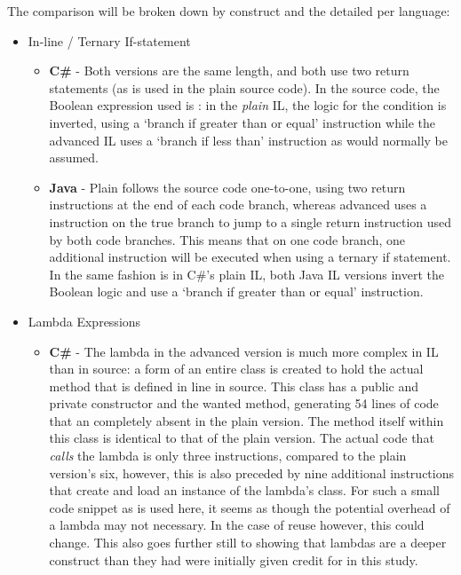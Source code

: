 \documentclass{article}
\begin{document}
        The comparison will be broken down by construct and the detailed per language:

        \begin{itemize}
            \item In-line / Ternary If-statement
            \begin{itemize}
                \item \textbf{C\#} - Both versions are the same length, and both use two return statements (as is used in the plain source code). In the source code, the Boolean expression used is : in the \emph{plain} IL, the logic for the condition is inverted, using a `branch if greater than or equal' instruction while the advanced IL uses a `branch if less than' instruction as would normally be assumed.
                \item \textbf{Java} - Plain follows the source code one-to-one, using two return instructions at the end of each code branch, whereas advanced uses a  instruction on the true branch to jump to a single return instruction used by both code branches. This means that on one code branch, one additional instruction will be executed when using a ternary if statement. In the same fashion is in C\#'s plain IL, both Java IL versions invert the Boolean logic and use a `branch if greater than or equal' instruction.
            \end{itemize}
            \item Lambda Expressions
            \begin{itemize}
                \item \textbf{C\#} - The lambda in the advanced version is much more complex in IL than in source: a form of an entire class is created to hold the actual method that is defined in line in source. This class has a public and private constructor and the wanted method, generating 54 lines of code that an completely absent in the plain version. The method itself within this class is identical to that of the plain version. The actual code that \emph{calls} the lambda is only three instructions, compared to the plain version's six, however, this is also preceded by nine additional instructions that create and load an instance of the lambda's class. For such a small code snippet as is used here, it seems as though the potential overhead of a lambda may not necessary. In the case of reuse however, this could change. This also goes further still to showing that lambdas are a deeper construct than they had were initially given credit for in this study.

\end{itemize}
\end{itemize}
\end{document}
